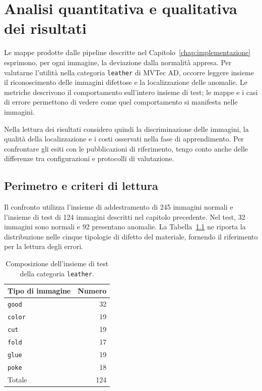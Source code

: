 \chapter[Analisi dei risultati]{Analisi quantitativa e qualitativa dei risultati}
\label{chap:risultati}

Le mappe prodotte dalle pipeline descritte nel Capitolo~\ref{chap:implementazione} esprimono, per ogni immagine, la deviazione dalla normalità appresa. Per valutarne l'utilità nella categoria \texttt{leather} di MVTec AD, occorre leggere insieme il riconoscimento delle immagini difettose e la localizzazione delle anomalie. Le metriche descrivono il comportamento sull'intero insieme di test; le mappe e i casi di errore permettono di vedere come quel comportamento si manifesta nelle immagini.

Nella lettura dei risultati considero quindi la discriminazione delle immagini, la qualità della localizzazione e i costi osservati nella fase di apprendimento. Per confrontare gli esiti con le pubblicazioni di riferimento, tengo conto anche delle differenze tra configurazioni e protocolli di valutazione.

\section{Perimetro e criteri di lettura}
\label{sec:cap4-protocollo}

Il confronto utilizza l'insieme di addestramento di 245 immagini normali e l'insieme di test di 124 immagini descritti nel capitolo precedente. Nel test, 32 immagini sono normali e 92 presentano anomalie. La Tabella~\ref{tab:cap4-difetti} ne riporta la distribuzione nelle cinque tipologie di difetto del materiale, fornendo il riferimento per la lettura degli errori.

\begin{table}[htbp]
\centering
\begin{tabular}{lr}
\hline
Tipo di immagine & Numero \\
\hline
\texttt{good} & 32 \\
\texttt{color} & 19 \\
\texttt{cut} & 19 \\
\texttt{fold} & 17 \\
\texttt{glue} & 19 \\
\texttt{poke} & 18 \\
\hline
Totale & 124 \\
\hline
\end{tabular}
\caption{Composizione dell'insieme di test della categoria \texttt{leather}.}
\label{tab:cap4-difetti}
\end{table}

